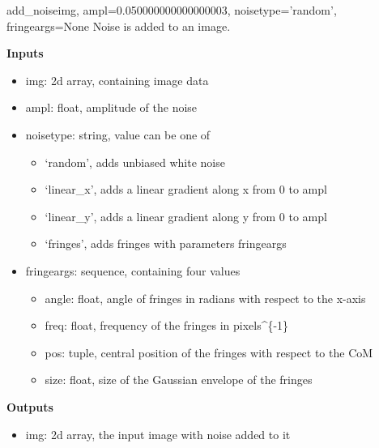 \documentclass[letterpaper,10pt,english]{manual}
\begin{document}
\hypertarget{odysseus.refimages.add_noise}{}\begin{funcdesc}{add\_noise}{img, ampl=0.050000000000000003, noisetype='random', fringeargs=None}
Noise is added to an image.

\textbf{Inputs}
\begin{itemize}
\item {} 
img: 2d array, containing image data

\item {} 
ampl: float, amplitude of the noise

\item {} 
noisetype: string, value can be one of
\begin{itemize}
\item {} 
`random', adds unbiased white noise

\item {} 
`linear\_x', adds a linear gradient along x from 0 to ampl

\item {} 
`linear\_y', adds a linear gradient along y from 0 to ampl

\item {} 
`fringes', adds fringes with parameters fringeargs

\end{itemize}

\item {} 
fringeargs: sequence, containing four values
\begin{itemize}
\item {} 
angle: float, angle of fringes in radians with respect to the x-axis

\item {} 
freq: float, frequency of the fringes in pixels\textasciicircum{}\{-1\}

\item {} 
pos: tuple, central position of the fringes with respect to the CoM

\item {} 
size: float, size of the Gaussian envelope of the fringes

\end{itemize}

\end{itemize}

\textbf{Outputs}
\begin{itemize}
\item {} 
img: 2d array, the input image with noise added to it

\end{itemize}
\end{funcdesc}
\end{document}
